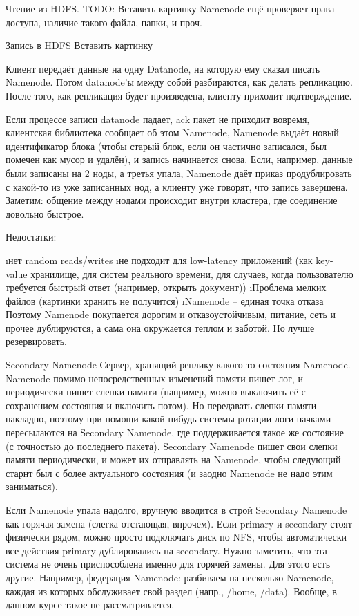 Чтение из HDFS.
TODO: Вставить картинку
Namenode ещё проверяет права доступа, наличие такого файла, папки, и проч.

Запись в HDFS
Вставить картинку

Клиент передаёт данные на одну Datanode, на которую ему сказал писать Namenode. Потом datanode'ы между собой разбираются, как делать репликацию. После того, как репликация будет произведена, клиенту приходит подтверждение. 

Если процессе записи datanode падает, ack пакет не приходит вовремя, клиентская библиотека сообщает об этом Namenode, Namenode выдаёт новый идентификатор блока (чтобы старый блок, если он частично записался, был помечен как мусор и удалён), и запись начинается снова.
Если, например, данные были записаны на 2 ноды, а третья упала, Namenode даёт приказ продублировать с какой-то из уже записанных нод, а клиенту уже говорят, что запись завершена. 
Заметим: общение между нодами происходит внутри кластера, где соединение довольно быстрое.

Недостатки:
\begin{enumerate}
	\i нет random reads/writes
	\i не подходит для low-latency приложений (как key-value хранилище, для систем реального времени, для случаев, когда пользователю требуется быстрый ответ (например, открыть документ))
	\i Проблема мелких файлов (картинки хранить не получится)
	\i Namenode -- единая точка отказа
	Поэтому Namenode покупается дорогим и отказоустойчивым, питание, сеть и прочее дублируются, а сама она окружается теплом и заботой. Но лучше резервировать.
\end{enumerate}

Secondary Namenode 
Сервер, хранящий реплику какого-то состояния Namenode.
Namenode помимо непосредственных изменений памяти пишет лог, и периодически пишет слепки памяти (например, можно выключить её с сохранением состояния и включить потом). Но передавать слепки памяти накладно, поэтому при помощи какой-нибудь системы ротации логи пачками пересылаются на Secondary Namenode, где поддерживается такое же состояние (с точностью до последнего пакета). Secondary Namenode пишет свои слепки памяти периодически, и может их отправлять на Namenode, чтобы следующий старнт был с более актуального состояния (и заодно Namenode не надо этим заниматься).

Если Namenode упала надолго, вручную вводится в строй Secondary Namenode как горячая замена (слегка отстающая, впрочем).
Если primary и secondary стоят физически рядом, можно просто подключать диск по NFS, чтобы автоматически все действия primary дублировались на secondary.
Нужно заметить, что эта система не очень приспособлена именно для горячей замены. Для этого есть другие.
Например, федерация Namenode: разбиваем на несколько Namenode, каждая из которых обслуживает свой раздел (напр., /home, /data). Вообще, в данном курсе такое не рассматривается.

